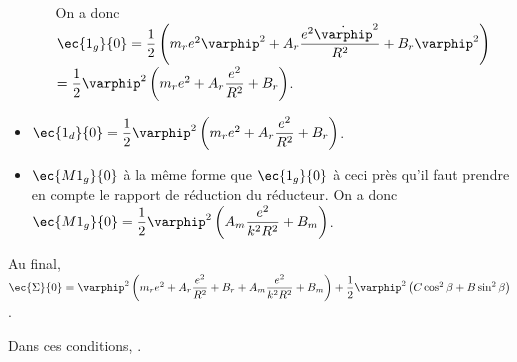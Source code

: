 \begin{corrige}
\begin{itemize}
\begin{itemize}
On a donc 
$\ec{1_g}{0}= \dfrac{1}{2} \left(m_re^2\varphip^2 + A_r \dfrac{e^2 \dot{\varphip}^2}{R^2} + B_r \varphip^2\right)$
$= \dfrac{1}{2} \varphip^2\left(m_re^2 + A_r \dfrac{e^2}{R^2} + B_r \right)$.
\end{itemize}
\item $\ec{1_d}{0}= \dfrac{1}{2} \varphip^2\left(m_re^2 + A_r \dfrac{e^2}{R^2} + B_r \right)$.

\item $\ec{M1_g}{0}$ à la même forme que $\ec{1_g}{0}$ à ceci près qu'il faut prendre en compte le rapport de réduction du réducteur. On a donc $\ec{M1_g}{0}= \dfrac{1}{2} \varphip^2\left( A_m \dfrac{e^2}{k^2 R^2} + B_m \right)$.
\end{itemize}

Au final, $\ec{\Sigma}{0} =  \varphip^2\left(m_re^2 + A_r \dfrac{e^2}{R^2} + B_r +  A_m \dfrac{e^2}{k^2 R^2} + B_m \right)+\dfrac{1}{2}\varphip^2 \left(C\cos^2\beta +B\sin^2\beta\right)$.

Dans ces conditions, .
\end{corrige}
\else
\fi


